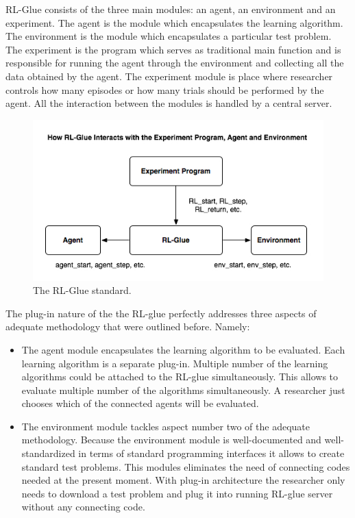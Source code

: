 {{RL-Glue consists of the three main modules: an agent, an environment and an experiment. The agent is the module which encapsulates the learning algorithm. The environment is the module which encapsulates a particular test problem. The experiment is the program which serves as traditional main function and is responsible for running the agent through the environment and collecting all the data obtained by the agent. The experiment module is place where researcher controls how many episodes or how many trials should be performed by the agent. All the interaction between the modules is handled by a central server. \\
\begin{figure}[ht]
\vskip 0.2in
\centering
\includegraphics[scale=0.9]{glue.png}
\caption{The RL-Glue standard.}
\vskip -0.2in
\label{rlglue}
\end{figure}
The plug-in nature of the the RL-glue perfectly addresses three aspects of adequate methodology that were outlined before. Namely:

\begin{itemize}

\item The agent module encapsulates the learning algorithm to be evaluated. Each learning algorithm is a separate plug-in. Multiple number of the learning algorithms could be attached to the RL-glue simultaneously. This allows to evaluate multiple number of the algorithms simultaneously. A researcher just chooses which of the connected agents will be evaluated.

\item The environment module tackles aspect number two of the adequate methodology. Because the environment module is well-documented and well-standardized in terms of standard programming interfaces it allows to create standard test problems. This modules eliminates the need of connecting codes needed at the present moment. With plug-in architecture the researcher only needs to download a test problem and plug it into running RL-glue server without any connecting code.


\end{itemize}}}
